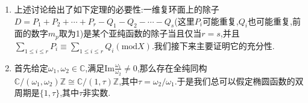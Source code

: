 \begin{enumerate}
    \begin{itemize}
    	\item 椭圆整函数必然是常值函数.因为双周期$\omega_1,\omega_2$是实线性无关的保证了它的周期是一个连通的有界闭子集,而我们知道紧连通黎曼曲面整函数必然是常值的.
    	\item 设$F$是椭圆函数,它的零点和极点都不落在某个基本网孔$\Pi_{z_0}$的边界上,那么$\sum_{p\in\Pi_{z_0}}\mathrm{Res}_pF=0$.因为左边这个和就是$F(z)/2\pi i$在$\Pi_{z_0}$边界的积分.
    	\item 条件同上一条,此时$F'(z)/F(z)$也是一个相同双周期的椭圆函数,于是它在$\Pi_{z_0}$边界的积分仍然是零,按照俯角原理,这说明椭圆函数在$\Pi_{z_0}$内的零点个数恰好等于极点个数,这里零点和极点都是计算重数的.
    	\item 条件同上一条,设椭圆函数$F$的全部零点为$z_1,z_2,\cdots,z_r$,全部极点为$p_1,p_2,\cdots,p_r$,这里都是计重数表示的,那么$\sum_{1\le i\le r}z_i\equiv\sum_{1\le i\le r}p_i\mathrm{mod}X$.
    	\begin{proof}
    		
    		首先我们有如下一般的公式,取$\phi(z)=z$,于是问题归结为证明$\frac{1}{2\pi i}\int_{\partial\Pi_{z_0}}z\frac{F'(z)}{F(z)}\mathrm{d}z$落在完备格$X$中.
    		$$\sum_{1\le i\le r}\phi(z_i)-\sum_{1\le i\le r}\phi(p_i)=\frac{1}{2\pi i}\int_{\partial\Pi_{z_0}}z\frac{F'(z)}{F(z)}\mathrm{d}z$$
    		
    		但是我们有如下等式,按照俯角原理,最后式子的两个括号都是整数.
    		\begin{align*}
    		\frac{1}{2\pi i}\int_{\partial\Pi_{z_0}}z\frac{F'(z)}{F(z)}\mathrm{d}z&=\frac{1}{2\pi i}\left(\int_{[z_0,z_0+\omega_1]}-\int_{[z_0+\omega_2,z_0+\omega_1+\omega_2]}-\int_{[z_0,z_0+\omega_2]}+\int_{[z_0+\omega_2,z_0+\omega_1+\omega_2]}\right)\\&=\omega_2\left(\frac{1}{2\pi i}\int_{[z_0,z_0+\omega_1]}\frac{F'(z)}{F(z)}\mathrm{d}z\right)+\omega_1\left(\frac{1}{2\pi i}\int_{[z_0,z_0+\omega_2]}\frac{F'(z)}{F(z)}\mathrm{d}z\right)
    		\end{align*}
    	\end{proof}
    \end{itemize}
    \item 上述讨论给出了如下定理的必要性:一维复环面上的除子$D=P_1+P_2+\cdots+P_r-Q_1-Q_2-\cdots-Q_s$(这里$P_i$可能重复,$Q_i$也可能重复,前面的数字$m_p$取为1)是某个亚纯函数的除子当且仅当$r=s$,并且$\sum_{1\le i\le r}P_i\equiv\sum_{1\le i\le r}Q_i(\mathrm{mod}X)$.我们接下来主要证明它的充分性.
    \item 首先给定$\omega_1,\omega_2\in\mathbb{C}$,满足$\mathrm{Im}\frac{\omega_1}{\omega_2}\not=0$,那么存在全纯同构$\mathbb{C}/(\omega_1,\omega_2)\mathbb{Z}\cong\mathbb{C}/(1,\tau)\mathbb{Z}$,其中$\tau=\omega_2/\omega_1$.于是我们总可以假定椭圆函数的双周期是$\{1,\tau\}$,其中$\tau$非实数.
\end{enumerate}

